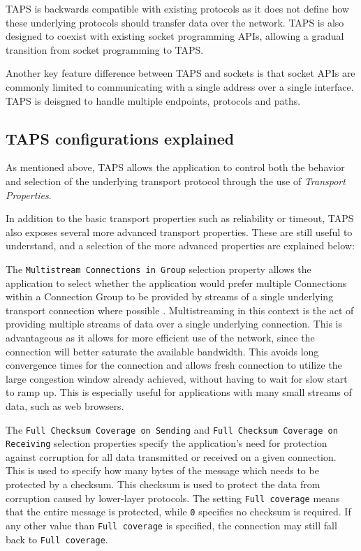 TAPS is backwards compatible with existing protocols as it does not
define how these underlying protocols should transfer data over
the network. TAPS is also designed to coexist with existing
socket programming APIs, allowing a gradual transition from
socket programming to TAPS.

Another key feature difference between TAPS and sockets is that socket
APIs are commonly limited to communicating with a single address over 
a single interface. TAPS is deisgned to handle multiple endpoints,
protocols and paths.


\subsection{TAPS configurations explained}

As mentioned above, TAPS allows the application to control
both the behavior and selection of the underlying transport
protocol through the use of \textit{Transport Properties}.

In addition to the basic transport properties such as reliability
or timeout, TAPS also exposes several more advanced
transport properties. These are still useful to understand,
and a selection of the more advanced properties are explained below:

The \texttt{Multistream Connections in Group} selection property
allows the application to select whether the
application would prefer multiple Connections within a
Connection Group to be provided by streams of a single
underlying transport connection where possible
\cite{paulyArchitectureRequirementsTransport2025}.
Multistreaming in this context is the act of providing multiple
streams of data over a single underlying connection. This is
advantageous as it allows for more efficient use of the network,
since the connection will better saturate the available
bandwidth. This avoids long convergence times for the connection
and allows fresh connection to utilize the large congestion
window already achieved, without having to wait for slow start
to ramp up. This is especially useful for applications with many
small streams of data, such as web browsers.

The \texttt{Full Checksum Coverage on Sending} and \texttt{Full
	Checksum Coverage on Re\-ceiving} selection properties specify
the application's need for protection against corruption for all
data transmitted or received on a given connection. This is used
to specify how many bytes of the message which needs to be
protected by a checksum. This checksum is used to protect the
data from corruption caused by lower-layer protocols. The
setting \texttt{Full coverage} means that the entire message is
protected, while \texttt{0} specifies no checksum is required.
If any other value than \texttt{Full coverage} is specified, the
connection may still fall back to \texttt{Full coverage}.

